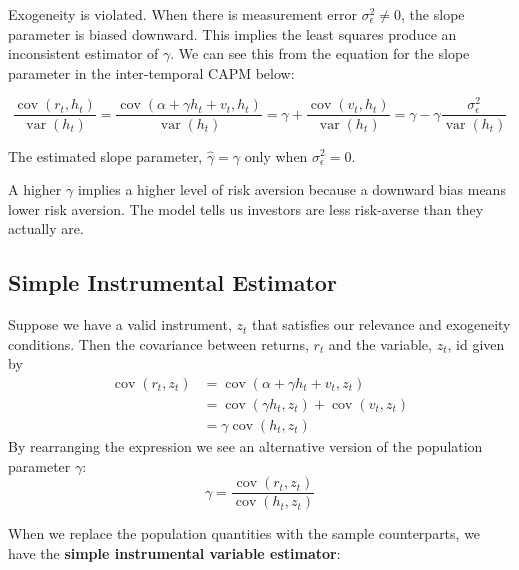 \documentclass[11pt]{article}
\begin{document}
Exogeneity is violated. When there is measurement error $\sigma_\epsilon^2\neq0$, the slope parameter is biased downward. This implies the least squares produce an inconsistent estimator of $\gamma$. We can see this from the equation for the slope parameter in the inter-temporal CAPM below:

\begin{equation}
\frac{\operatorname{cov}\left(r_t, h_t\right)}{\operatorname{var}\left(h_t\right)}=\frac{\operatorname{cov}\left(\alpha+\gamma h_t+v_t, h_t\right)}{\operatorname{var}\left(h_t\right)}=\gamma+\frac{\operatorname{cov}\left(v_t, h_t\right)}{\operatorname{var}\left(h_t\right)}=\gamma-\gamma \frac{\sigma_\epsilon^2}{\operatorname{var}\left(h_t\right)}
\end{equation}

The estimated slope parameter, $\hat{\gamma}=\gamma$ only when $\sigma_\epsilon^2=0$.

A higher $\gamma$ implies a higher level of risk aversion because a downward bias means lower risk aversion. The model tells us investors are less risk-averse than they actually are.

\subsection{Simple Instrumental Estimator}

Suppose we have a valid instrument, $z_t$ that satisfies our relevance and exogeneity conditions. Then the covariance between returns, $r_t$ and the variable, $z_t$, id given by
\begin{equation}
\begin{aligned}
\operatorname{cov}\left(r_t, z_t\right) & =\operatorname{cov}\left(\alpha+\gamma h_t+v_t, z_t\right) \\
& =\operatorname{cov}\left(\gamma h_t, z_t\right)+\operatorname{cov}\left(v_t, z_t\right) \\
& =\gamma \operatorname{cov}\left(h_t, z_t\right)
\end{aligned}
\end{equation}
By rearranging the expression we see an alternative version of the population parameter $\gamma$:
\begin{equation}
\gamma=\frac{\operatorname{cov}\left(r_t, z_t\right)}{\operatorname{cov}\left(h_t, z_t\right)}
\end{equation}

When we replace the population quantities with the sample counterparts, we have the \textbf{simple instrumental variable estimator}:
\end{document}

